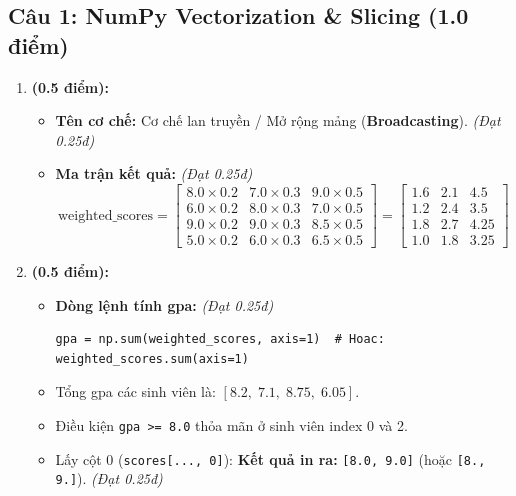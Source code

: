 \documentclass[11pt,a4paper]{article}
\begin{document}
\subsection*{Câu 1: NumPy Vectorization \& Slicing (1.0 điểm)}
\begin{enumerate}[label=\textbf{\alph*)}]
  \item \textbf{(0.5 điểm):}
  \begin{itemize}
    \item \textbf{Tên cơ chế:} Cơ chế lan truyền / Mở rộng mảng (\textbf{Broadcasting}). \textit{(Đạt 0.25đ)}
    \item \textbf{Ma trận kết quả:} \textit{(Đạt 0.25đ)}
    $$\text{weighted\_scores} = \begin{bmatrix}
      8.0\times 0.2 & 7.0\times 0.3 & 9.0\times 0.5 \\
      6.0\times 0.2 & 8.0\times 0.3 & 7.0\times 0.5 \\
      9.0\times 0.2 & 9.0\times 0.3 & 8.5\times 0.5 \\
      5.0\times 0.2 & 6.0\times 0.3 & 6.5\times 0.5
    \end{bmatrix} = \begin{bmatrix}
      1.6 & 2.1 & 4.5 \\
      1.2 & 2.4 & 3.5 \\
      1.8 & 2.7 & 4.25 \\
      1.0 & 1.8 & 3.25
    \end{bmatrix}$$
  \end{itemize}

  \item \textbf{(0.5 điểm):}
  \begin{itemize}
    \item \textbf{Dòng lệnh tính gpa:} \textit{(Đạt 0.25đ)}
\begin{lstlisting}
gpa = np.sum(weighted_scores, axis=1)  # Hoac: weighted_scores.sum(axis=1)
\end{lstlisting}
    \item Tổng gpa các sinh viên là: $[8.2, \; 7.1, \; 8.75, \; 6.05]$.
    \item Điều kiện \texttt{gpa >= 8.0} thỏa mãn ở sinh viên index 0 và 2.
    \item Lấy cột 0 (\texttt{scores[..., 0]}): \textbf{Kết quả in ra:} \texttt{[8.0, 9.0]} (hoặc \texttt{[8., 9.]}). \textit{(Đạt 0.25đ)}
  \end{itemize}
\end{enumerate}
\end{document}
